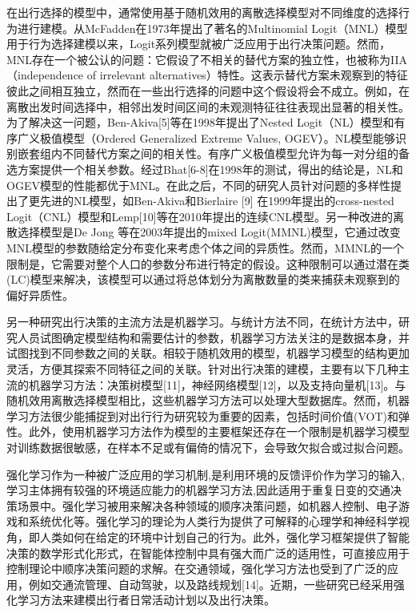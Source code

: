 在出行选择的模型中，通常使用基于随机效用的离散选择模型对不同维度的选择行为进行建模。从McFadden\cite{mcfadden1973conditional}在1973年提出了著名的Multinomial Logit（MNL）模型用于行为选择建模以来，Logit系列模型就被广泛应用于出行决策问题。然而，MNL存在一个被公认的问题：它假设了不相关的替代方案的独立性，也被称为IIA（independence of irrelevant alternatives）特性。这表示替代方案未观察到的特征彼此之间相互独立，然而在一些出行选择的问题中这个假设将会不成立。例如，在离散出发时间选择中，相邻出发时间区间的未观测特征往往表现出显著的相关性。为了解决这一问题，Ben-Akiva[5]等在1998年提出了Nested Logit（NL）模型和有序广义极值模型（Ordered Generalized Extreme Values, OGEV）。NL模型能够识别嵌套组内不同替代方案之间的相关性。有序广义极值模型允许为每一对分组的备选方案提供一个相关参数。经过Bhat[6-8]在1998年的测试，得出的结论是，NL和OGEV模型的性能都优于MNL。在此之后，不同的研究人员针对问题的多样性提出了更先进的NL模型，如Ben-Akiva和Bierlaire [9] 在1999年提出的cross-nested Logit（CNL）模型和Lemp[10]等在2010年提出的连续CNL模型。另一种改进的离散选择模型是De Jong 等在2003年提出的mixed Logit(MMNL)模型\cite{de2003model}，它通过改变MNL模型的参数随给定分布变化来考虑个体之间的异质性。然而，MMNL的一个限制是，它需要对整个人口的参数分布进行特定的假设。这种限制可以通过潜在类(LC)模型来解决，该模型可以通过将总体划分为离散数量的类来捕获未观察到的偏好异质性\cite{fukuda2010semiparametric}。

另一种研究出行决策的主流方法是机器学习。与统计方法不同，在统计方法中，研究人员试图确定模型结构和需要估计的参数，机器学习方法关注的是数据本身，并试图找到不同参数之间的关联。相较于随机效用的模型，机器学习模型的结构更加灵活，方便其探索不同特征之间的关联。针对出行决策的建模，主要有以下几种主流的机器学习方法：决策树模型[11]，神经网络模型[12]，以及支持向量机[13]。与随机效用离散选择模型相比，这些机器学习方法可以处理大型数据库。然而，机器学习方法很少能捕捉到对出行行为研究较为重要的因素，包括时间价值(VOT)和弹性。此外，使用机器学习方法作为模型的主要框架还存在一个限制是机器学习模型对训练数据很敏感，在样本不足或有偏倚的情况下，会导致欠拟合或过拟合问题。

强化学习作为一种被广泛应用的学习机制,是利用环境的反馈评价作为学习的输入,学习主体拥有较强的环境适应能力的机器学习方法,因此适用于重复日变的交通决策场景中。强化学习被用来解决各种领域的顺序决策问题，如机器人控制、电子游戏和系统优化等。强化学习的理论为人类行为提供了可解释的心理学和神经科学视角，即人类如何在给定的环境中计划自己的行为。此外，强化学习框架提供了智能决策的数学形式化形式，在智能体控制中具有强大而广泛的适用性，可直接应用于控制理论中顺序决策问题的求解。在交通领域，强化学习方法也受到了广泛的应用，例如交通流管理、自动驾驶，以及路线规划[14]。近期，一些研究已经采用强化学习方法来建模出行者日常活动计划以及出行决策。

